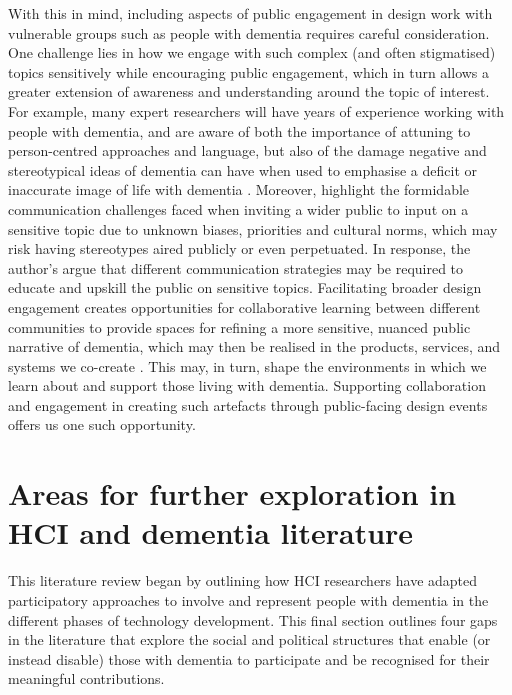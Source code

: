 With this in mind, including aspects of public engagement in design work with vulnerable groups such as people with dementia requires careful consideration. One challenge lies in how we engage with such complex (and often stigmatised) topics sensitively while encouraging public engagement, which in turn allows a greater extension of awareness and understanding around the topic of interest. For example, many expert researchers will have years of experience working with people with dementia, and are aware of both the importance of attuning to person-centred approaches \citep{fazio_fundamentals_2018} and language, but also of the damage negative and stereotypical ideas of dementia can have when used to emphasise a deficit or inaccurate image of life with dementia \citep{young_expanding_2019}. Moreover, \cite{niederdeppe2008message} highlight the formidable communication challenges faced when inviting a wider public to input on a sensitive topic due to unknown biases, priorities and cultural norms, which may risk having stereotypes aired publicly or even perpetuated. In response, the author's argue that different communication strategies may be required to educate and upskill the public on sensitive topics. Facilitating broader design engagement creates opportunities for collaborative learning between different communities to provide spaces for refining a more sensitive, nuanced public narrative of dementia, which may then be realised in the products, services, and systems we co-create \citep{costanza-chock_design_2020}. This may, in turn, shape the environments in which we learn about and support those living with dementia. Supporting collaboration and engagement in creating such artefacts through public-facing design events offers us one such opportunity. 

\section{Areas for further exploration in HCI and dementia literature}
\label{BL:Missing-gaps}
This literature review began by outlining how HCI researchers have adapted participatory approaches to involve and represent people with dementia in the different phases of technology development. This final section outlines four gaps in the literature that explore the social and political structures that enable (or instead disable) those with dementia to participate and be recognised for their meaningful contributions. 

